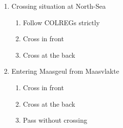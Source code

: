 \begin{multicols}{2}
	\begin{spacing}{1}
	\begin{enumerate}
		\item Crossing situation at North-Sea
		\begin{enumerate}[label=(\Alph*)]
			\item Follow COLREGs strictly
			\item Cross in front
			\item Cross at the back
		\end{enumerate}
		\item Entering Maasgeul from Maasvlakte
		\begin{enumerate}[label=(\Alph*)]
			\item Cross in front
			\item Cross at the back
			\item Pass without crossing
		\end{enumerate}
	\end{enumerate}
	\end{spacing}
\end{multicols}


